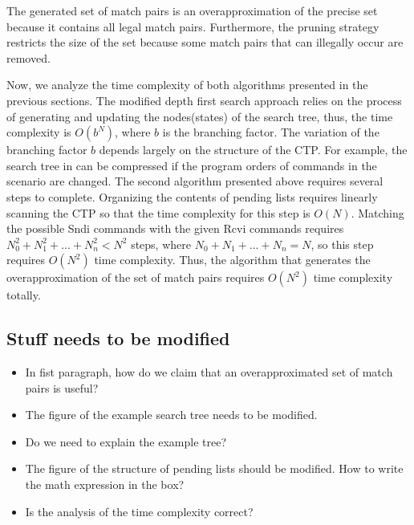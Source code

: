 The generated set of match pairs is an overapproximation of the precise set because it contains all legal match pairs. Furthermore, the pruning strategy restricts the size of the set because some match pairs that can illegally occur are removed.

Now, we analyze the time complexity of both algorithms presented in the previous sections. The modified depth first search approach relies on the process of generating and updating the nodes(states) of the search tree, thus, the time complexity is $O(b^N)$, where $b$ is the branching factor. The variation of the branching factor $b$ depends largely on the structure of the CTP. For example, the search tree in  can be compressed if the program orders of commands in the scenario are changed. The second algorithm presented above requires several steps to complete. Organizing the contents of pending lists requires linearly scanning the CTP so that the time complexity for this step is $O(N)$. Matching the possible Sndi commands with the given Rcvi commands requires $N_0^2 + N_1^2 + ... + N_n^2 < N^2$ steps, where $N_0 + N_1 + ... + N_n = N$, so this step requires $O(N^2)$ time complexity. Thus, the algorithm that generates the overapproximation of the set of match pairs requires $O(N^2)$ time complexity totally.

\subsection{Stuff needs to be modified}
\begin{itemize}
\item In fist paragraph, how do we claim that an overapproximated set of match pairs is useful? 
\item The figure of the example search tree needs to be modified.
\item Do we need to explain the example tree?
\item The figure of the structure of pending lists should be modified. How to write the math expression in the box?
\item Is the analysis of the time complexity correct?    
\end{itemize}
